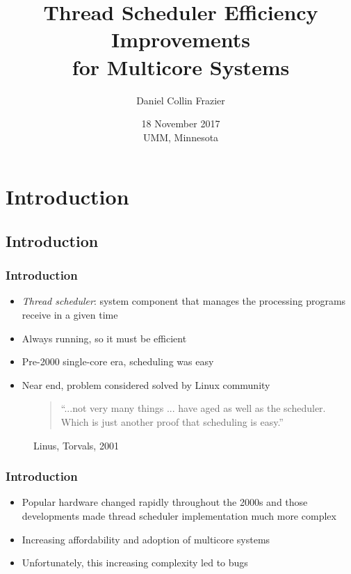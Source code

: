 \documentclass{beamer}
\title[Developmental plasticity in N-gram GP]{Thread Scheduler Efficiency Improvements \\ for Multicore Systems}
\author[DFrz]{Daniel Collin Frazier}
\institute[U of Minn, Morris]
{
  Division of Science and Mathematics \\
  University of Minnesota, Morris \\
  Morris, Minnesota, USA
}
\date[November '17, UMM, Minnesota] %
{18 November 2017 \\ UMM, Minnesota}
\newcommand{\linespace}{\vskip 0.25cm}
\begin{document}
\begin{frame}
\titlepage
\end{frame}


\section*{Introduction}

\subsection*{Introduction}

\begin{frame}
  \frametitle{Introduction}
  
\begin{itemize}
	\item \emph{Thread scheduler}: system component that manages the processing programs receive in a given time
  	\item Always running, so it must be efficient
  	
	\linespace
	
	\item Pre-2000 single-core era, scheduling was easy 
	\item Near end, problem considered solved by Linux community

\end{itemize}

\end{frame}


\begin{frame}

\begin{figure}

\begin{quote}
``...not very many things ... have aged as well as the scheduler. Which is just another proof that scheduling is easy.''
\end{quote}
Linus, Torvals, 2001 \cite{Lozi:2016}
\end{figure}
\end{frame}

\begin{frame}
\frametitle{Introduction}

\begin{itemize}
\item Popular hardware changed rapidly throughout the 2000s and those developments made thread scheduler implementation much more complex

\linespace

\item Increasing affordability and adoption of multicore systems

\linespace

\item Unfortunately, this increasing complexity led to bugs
\end{itemize}
\end{frame}
\end{document}
